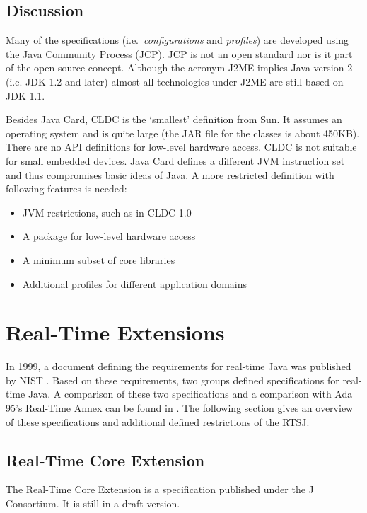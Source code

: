 \subsection{Discussion}

Many of the specifications (i.e.\ \textit{configurations} and
\textit{profiles}) are developed using the Java Community Process
(JCP). JCP is not an open standard nor is it part of the open-source
concept. Although the acronym J2ME implies Java version 2 (i.e. JDK
1.2 and later) almost all technologies under J2ME are still based on
JDK 1.1.

Besides Java Card, CLDC is the `smallest' definition from Sun. It
assumes an operating system and is quite large (the JAR file for the
classes is about 450KB). There are no API definitions for low-level
hardware access. CLDC is not suitable for small embedded devices.
Java Card defines a different JVM instruction set and thus
compromises basic ideas of Java. A more restricted definition with
following features is needed:
%
\begin{itemize}
    \item JVM restrictions, such as in CLDC 1.0
    \item A package for low-level hardware access
    \item A minimum subset of core libraries
    \item Additional profiles for different application domains
\end{itemize}


\section{Real-Time Extensions}

In 1999, a document defining the requirements for real-time Java was
published by NIST \cite{nist99}. Based on these requirements, two
groups defined specifications for real-time Java. A comparison of
these two specifications and a comparison with Ada 95's Real-Time
Annex can be found in \cite{507579}. The following section gives an
overview of these specifications and additional defined restrictions
of the RTSJ.

\subsection{Real-Time Core Extension}

The Real-Time Core Extension \cite{JCons00} is a specification
published under the J Consortium. It is still in a draft version.


